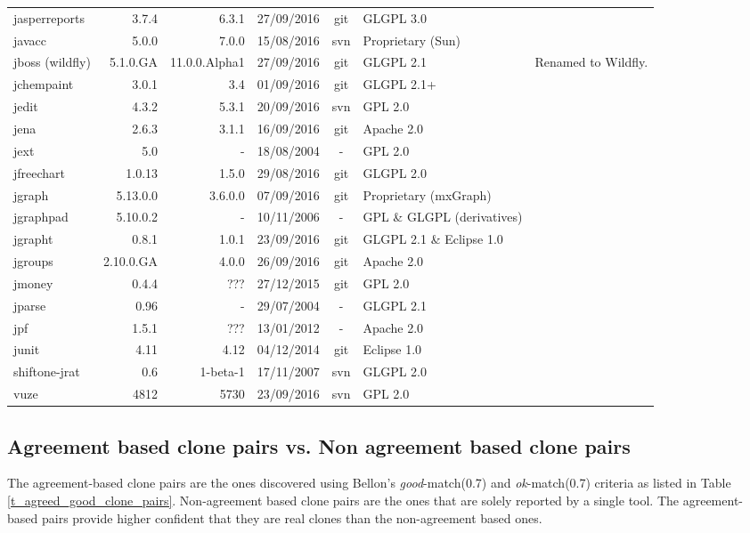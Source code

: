 \documentclass{sig-alternate-05-2015}
\begin{document}
\begin{table}
\begin{tabular}{l|r|r|c|c|p{3cm}|p{3cm}}
			jasperreports & 3.7.4 & 6.3.1 & 27/09/2016 & git & GLGPL 3.0 &  \\
			javacc & 5.0.0 & 7.0.0 & 15/08/2016 & svn & Proprietary (Sun) \\
			jboss (wildfly) & 5.1.0.GA & 11.0.0.Alpha1 & 27/09/2016 & git & GLGPL 2.1 & Renamed to Wildfly. \\
			jchempaint & 3.0.1 & 3.4 & 01/09/2016 & git & GLGPL 2.1+ &  \\
			jedit & 4.3.2 & 5.3.1 & 20/09/2016 & svn & GPL 2.0 &  \\
			jena & 2.6.3 & 3.1.1 & 16/09/2016 & git & Apache 2.0 \\
			jext & 5.0 & - & 18/08/2004 & - & GPL 2.0 &  \\
			jfreechart & 1.0.13 & 1.5.0 & 29/08/2016 & git & GLGPL 2.0 &   \\
			jgraph & 5.13.0.0 & 3.6.0.0 & 07/09/2016 & git & Proprietary (mxGraph) \\
			jgraphpad & 5.10.0.2 & - & 10/11/2006 & - & GPL   \& GLGPL (derivatives) \\
			jgrapht & 0.8.1 & 1.0.1 & 23/09/2016 & git & GLGPL 2.1 \& Eclipse  1.0 \\
			jgroups & 2.10.0.GA & 4.0.0 & 26/09/2016 & git & Apache 2.0 \\
			jmoney & 0.4.4 & ??? & 27/12/2015 & git & GPL 2.0 &  \\
			jparse & 0.96 & - & 29/07/2004 & - & GLGPL 2.1 \\
			jpf & 1.5.1 & ??? & 13/01/2012 & - & Apache 2.0 \\
			junit & 4.11 & 4.12 & 04/12/2014 & git & Eclipse  1.0 \\
			shiftone-jrat & 0.6 & 1-beta-1 & 17/11/2007 & svn & GLGPL 2.0 &  \\
			vuze & 4812 & 5730 & 23/09/2016 & svn & GPL 2.0 & \\
			\hline 
		\end{tabular} %
\end{table}

\subsection{Agreement based clone pairs vs. Non agreement based clone pairs}

The agreement-based clone pairs are the ones discovered using Bellon's \textit{good}-match(0.7) and \textit{ok}-match(0.7) criteria as listed in  Table \ref{t_agreed_good_clone_pairs}. Non-agreement based clone pairs are the ones that are solely reported by a single tool. The agreement-based pairs provide higher confident that they are real clones than the non-agreement based ones.
\end{document}
